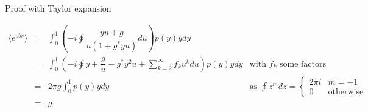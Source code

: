 \documentclass[a4paper]{article}
\begin{document}
Proof with Taylor expansion

$$
\begin{array}{rcll}
\langle e^{obs}\rangle
&=& {\displaystyle \int_0^1 \left( -i \oint \dfrac{yu+g}{u(1+g^*yu)} du \right) p(y)ydy } & \\
&=& {\displaystyle \int_0^1 \left( -i \oint y+\dfrac{g}{u}-g^*y^2u+\sum_{k=2}^\infty f_k u^k du \right) p(y)ydy } & \text{with $f_k$ some factors} \\
&=& 2\pi g {\displaystyle \int_0^1 p(y)ydy } & \text{as } {\displaystyle \oint z^m dz =\left\{\begin{array}{ll} 2\pi i & m=-1 \\ 0 & \text{otherwise} \end{array}\right.} \\
&=& g & \\
\end{array}
$$
\end{document}
